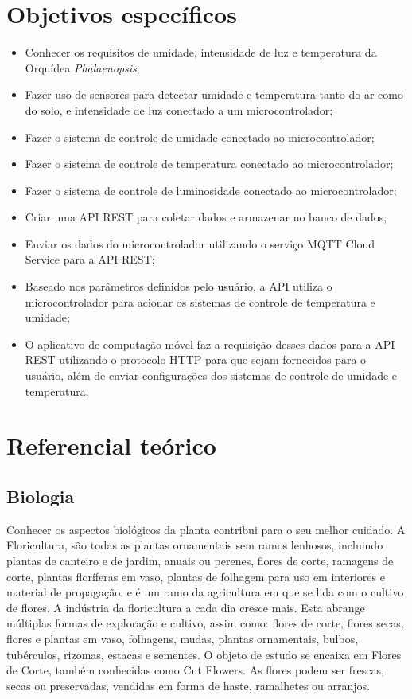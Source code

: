 \documentclass[conference]{IEEEtran}
\begin{document}
\section{Objetivos específicos}
\begin{itemize}
    \item Conhecer os requisitos de umidade, intensidade de luz e temperatura da Orquídea {\itshape{Phalaenopsis}};
    \item Fazer uso de sensores para detectar umidade e temperatura tanto do ar como do solo, e intensidade de luz conectado a um microcontrolador;
    \item Fazer o sistema de controle de umidade conectado ao microcontrolador;
    \item Fazer o sistema de controle de temperatura conectado ao microcontrolador;
    \item Fazer o sistema de controle de luminosidade conectado ao microcontrolador;
    \item Criar uma API REST para coletar dados e armazenar no banco de dados;
    \item Enviar os dados do microcontrolador utilizando o serviço MQTT Cloud Service para a API REST;
    \item Baseado nos parâmetros definidos pelo usuário, a API utiliza o microcontrolador para acionar os sistemas de controle de temperatura e umidade;
    \item O aplicativo de computação móvel faz a requisição desses dados para a API REST utilizando o protocolo HTTP para que sejam fornecidos para o usuário, além de enviar configurações dos sistemas de controle de umidade e temperatura.
\end{itemize}

\section{Referencial teórico}
\subsection{Biologia}
Conhecer os aspectos biológicos da planta contribui para o seu melhor cuidado. A Floricultura, são todas as plantas ornamentais sem ramos lenhosos, incluindo plantas de canteiro e de jardim, anuais ou perenes, flores de corte, ramagens de corte, plantas floríferas em vaso, plantas de folhagem para uso em interiores e material de propagação, e é um ramo da agricultura em que se lida com o cultivo de flores. A indústria da floricultura a cada dia cresce mais. Esta abrange múltiplas formas de exploração e cultivo, assim como: flores de corte, flores secas, flores e plantas em vaso, folhagens, mudas, plantas ornamentais, bulbos, tubérculos, rizomas, estacas e sementes.
O objeto de estudo se encaixa em Flores de Corte, também conhecidas como Cut Flowers. As flores podem ser frescas, secas ou preservadas, vendidas em forma de haste, ramalhetes ou arranjos.\cite{b2,b1}
\end{document}
